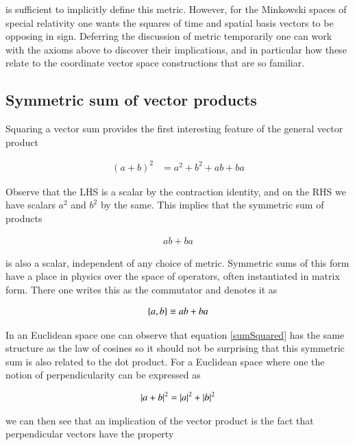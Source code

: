 is sufficient to implicitly define this metric.  However, for the Minkowski spaces of special relativity one wants the squares of time and spatial basis vectors to be opposing in sign.  Deferring the discussion of metric temporarily one can work with the axioms above to discover their implications, and in particular how these relate to the coordinate vector space constructions that are so familiar.

\subsection{Symmetric sum of vector products }

Squaring a vector sum provides the first interesting feature of the general vector product

\begin{align}\label{sumSquared}
(a + b)^2 %
&= a^2 + b^2 + a b + b a
\end{align}

Observe that the LHS is a scalar by the contraction identity, and on the RHS we have scalars $a^2$ and $b^2$ by the same.  This implies that the symmetric sum of products

\begin{align*}
a b + b a
\end{align*}

is also a scalar, independent of any choice of metric.  Symmetric sums of this form have a place in physics over the space of operators, often instantiated in matrix form.  There one writes this as the commutator and denotes it as

\begin{align}\label{eqn:intro_ga:anticommutator}
{\left\{{a},{b}\right\}} \equiv a b + b a
\end{align}

In an Euclidean space one can observe that equation \ref{sumSquared} has the same structure as the law of cosines so it should not be surprising that this symmetric sum is also related to the dot product.  For a Euclidean space where one the notion of perpendicularity can be expressed as

\begin{align*}
\left\lvert{ a + b }\right\rvert^2 = \left\lvert{a}\right\rvert^2 + \left\lvert{b}\right\rvert^2
\end{align*}

we can then see that an implication of the vector product is the fact that perpendicular vectors have the property

